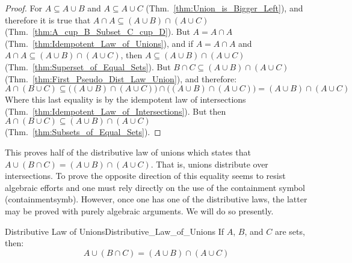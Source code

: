         \begin{proof}
            For $A\subseteq{A}\cup{B}$ and $A\subseteq{A}\cup{C}$
            (Thm.~\ref{thm:Union_is_Bigger_Left}), and therefore it is true that
            $A\cap{A}\subseteq(A\cup{B})\cap(A\cup{C})$
            (Thm.~\ref{thm:A_cup_B_Subset_C_cup_D}). But $A=A\cap{A}$
            (Thm.~\ref{thm:Idempotent_Law_of_Unions}), and if
            $A=A\cap{A}$ and $A\cap{A}\subseteq(A\cup{B})\cap(A\cup{C})$, then
            $A\subseteq(A\cup{B})\cap(A\cup{C})$
            (Thm.~\ref{thm:Superset_of_Equal_Sets}). But
            $B\cap{C}\subseteq(A\cup{B})\cap(A\cup{C})$
            (Thm.~\ref{thm:First_Pseudo_Dist_Law_Union}), and therefore:
            \begin{equation}
                A\cap(B\cup{C})\subseteq
                \big((A\cup{B})\cap(A\cup{C})\big)\cap
                \big((A\cup{B})\cap(A\cup{C})\big)
                =(A\cup{B})\cap(A\cup{C})
            \end{equation}
            Where this last equality is by the idempotent law of intersections
            (Thm.~\ref{thm:Idempotent_Law_of_Intersections}). But then
            $A\cap(B\cup{C})\subseteq(A\cup{B})\cap(A\cup{C})$
            (Thm.~\ref{thm:Subsets_of_Equal_Sets}).
        \end{proof}
        This proves half of the distributive law of unions which states that
        $A\cup(B\cap{C})=(A\cup{B})\cap(A\cup{C})$. That is, unions distribute
        over intersections. To prove the opposite direction of this equality
        seems to resist algebraic efforts and one must rely directly on the use
        of the containment symbol (\gls{containmentsymb}). However, once one has
        one of the distributive laws, the latter may be proved with purely
        algebraic arguments. We will do so presently.
        \newpage
        \begin{ftheorem}{Distributive Law of Unions}{Distributive_Law_of_Unions}
            If $A$, $B$, and $C$ are sets, then:
            \begin{equation*}
                A\cup(B\cap{C})=(A\cup{B})\cap(A\cup{C})
            \end{equation*}
        \end{ftheorem}
